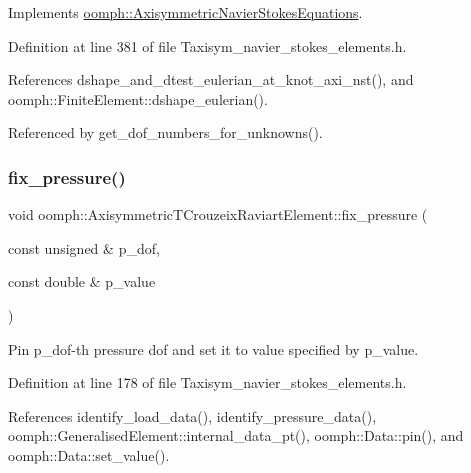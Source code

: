 Implements \hyperlink{classoomph_1_1AxisymmetricNavierStokesEquations_a8d958da8ef73dcf5c68360edc9d9f565}{oomph\+::\+Axisymmetric\+Navier\+Stokes\+Equations}.



Definition at line 381 of file Taxisym\+\_\+navier\+\_\+stokes\+\_\+elements.\+h.



References dshape\+\_\+and\+\_\+dtest\+\_\+eulerian\+\_\+at\+\_\+knot\+\_\+axi\+\_\+nst(), and oomph\+::\+Finite\+Element\+::dshape\+\_\+eulerian().



Referenced by get\+\_\+dof\+\_\+numbers\+\_\+for\+\_\+unknowns().

\mbox{\label{classoomph_1_1AxisymmetricTCrouzeixRaviartElement_a52bb17bda3d40b84947bf6ef14df26af}} 
\subsubsection{\texorpdfstring{fix\+\_\+pressure()}{fix\_pressure()}}
{\footnotesize\ttfamily void oomph\+::\+Axisymmetric\+T\+Crouzeix\+Raviart\+Element\+::fix\+\_\+pressure (\begin{DoxyParamCaption}\item[{const unsigned \&}]{p\+\_\+dof,  }\item[{const double \&}]{p\+\_\+value }\end{DoxyParamCaption})\hspace{0.3cm}{\ttfamily [inline]}}



Pin p\+\_\+dof-\/th pressure dof and set it to value specified by p\+\_\+value. 



Definition at line 178 of file Taxisym\+\_\+navier\+\_\+stokes\+\_\+elements.\+h.



References identify\+\_\+load\+\_\+data(), identify\+\_\+pressure\+\_\+data(), oomph\+::\+Generalised\+Element\+::internal\+\_\+data\+\_\+pt(), oomph\+::\+Data\+::pin(), and oomph\+::\+Data\+::set\+\_\+value().

